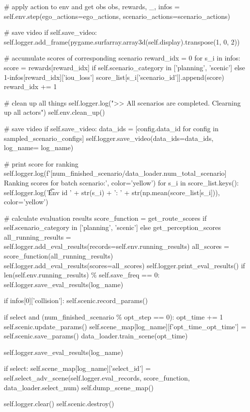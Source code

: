 \begin{appendix}
\# apply action to env and get obs
obs, rewards, \_, infos = self.env.step(ego\_actions=ego\_actions, scenario\_actions=scenario\_actions)

\# save video
if self.save\_video:
self.logger.add\_frame(pygame.surfarray.array3d(self.display).transpose(1, 0, 2))

\# accumulate scores of corresponding scenario
reward\_idx = 0
for s\_i in infos:
score = rewards[reward\_idx] if self.scenario\_category in ['planning', 'scenic'] else 1-infos[reward\_idx]['iou\_loss']
score\_list[s\_i['scenario\_id']].append(score)
reward\_idx += 1

\# clean up all things
self.logger.log(">> All scenarios are completed. Clearning up all actors")
self.env.clean\_up()

\# save video
if self.save\_video:
data\_ids = [config.data\_id for config in sampled\_scenario\_configs]
self.logger.save\_video(data\_ids=data\_ids, log\_name= log\_name)

\# print score for ranking
self.logger.log(f'[{num\_finished\_scenario}/{data\_loader.num\_total\_scenario}] Ranking scores for batch scenario:', color='yellow')
for s\_i in score\_list.keys():
self.logger.log('\t Env id ' + str(s\_i) + ': ' + str(np.mean(score\_list[s\_i])), color='yellow')

\# calculate evaluation results
score\_function = get\_route\_scores if self.scenario\_category in ['planning', 'scenic'] else get\_perception\_scores
all\_running\_results = self.logger.add\_eval\_results(records=self.env.running\_results)
all\_scores = score\_function(all\_running\_results)
self.logger.add\_eval\_results(scores=all\_scores)
self.logger.print\_eval\_results()
if len(self.env.running\_results) \% self.save\_freq == 0:
self.logger.save\_eval\_results(log\_name)

if infos[0]['collision']:
self.scenic.record\_params()

if select and (num\_finished\_scenario \% opt\_step == 0):
opt\_time += 1
self.scenic.update\_params()
self.scene\_map[log\_name][f'opt\_time\_{opt\_time}'] = self.scenic.save\_params()
data\_loader.train\_scene(opt\_time)

self.logger.save\_eval\_results(log\_name)

if select:
self.scene\_map[log\_name]['select\_id'] = self.select\_adv\_scene(self.logger.eval\_records, score\_function, data\_loader.select\_num)
self.dump\_scene\_map()

self.logger.clear()
self.scenic.destroy()


\end{appendix}
